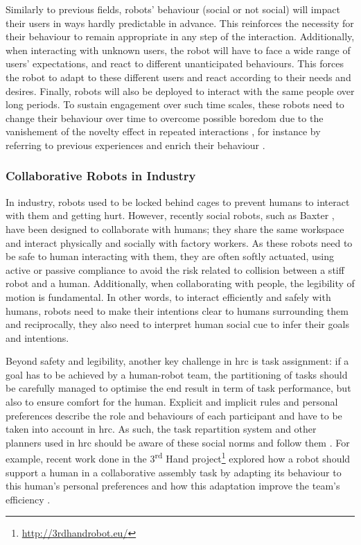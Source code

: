     Similarly to previous fields, robots' behaviour (social or not social) will impact their users in ways hardly predictable in advance. This reinforces the necessity for their behaviour to remain appropriate in any step of the interaction. Additionally, when interacting with unknown users, the robot will have to face a wide range of users' expectations, and react to different unanticipated behaviours. This forces the robot to adapt to these different users and react according to their needs and desires. Finally, robots will also be deployed to interact with the same people over long periods. To sustain engagement over such time scales, these robots need to change their behaviour over time to overcome possible boredom due to the vanishement of the novelty effect in repeated interactions \citep{salter2004robots}, for instance by referring to previous experiences and enrich their behaviour \citep{leite2013social}.

\subsubsection{Collaborative Robots in Industry}

	In industry, robots used to be locked behind cages to prevent humans to interact with them and getting hurt. However, recently social robots, such as Baxter \citep{guizzo2012rethink}, have been designed to collaborate with humans; they share the same workspace and interact physically and socially with factory workers. As these robots need to be safe to human interacting with them, they are often softly actuated, using active or passive compliance to avoid the risk related to collision between a stiff robot and a human. Additionally, when collaborating with people, the legibility of motion is fundamental. In other words, to interact efficiently and safely with humans, robots need to make their intentions clear to humans surrounding them \citep{dragan2013legibility} and reciprocally, they also need to interpret human social cue to infer their goals and intentions.
	
	Beyond safety and legibility, another key challenge in \gls{hrc} is task assignment: if a goal has to be achieved by a human-robot team, the partitioning of tasks should be carefully managed to  optimise the end result in term of task performance, but also to ensure comfort for the human. Explicit and implicit rules and personal preferences describe the role and behaviours of each participant and have to be taken into account in \gls{hrc}. As such, the task repartition system and other planners used in \gls{hrc} should be aware of these social norms and follow them \citep{montreuil2007planning}. For example, recent work done in the 3\textsuperscript{rd} Hand project\footnote{\url{http://3rdhandrobot.eu/}} explored how a robot should support a human in a collaborative assembly task by adapting its behaviour to this human's personal preferences and how this adaptation improve the team's efficiency \citep{munzer2017efficient}.
	
